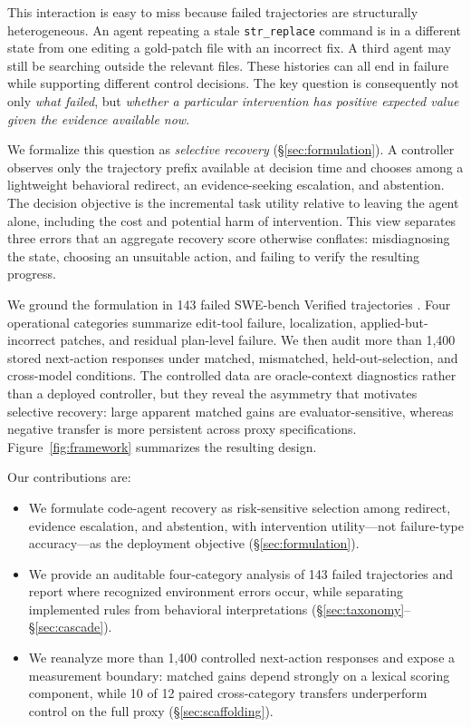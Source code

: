 \documentclass{article}
\begin{document}
This interaction is easy to miss because failed trajectories are structurally
heterogeneous.  An agent repeating a stale \texttt{str\_replace} command is in a
different state from one editing a gold-patch file with an incorrect fix.  A
third agent may still be searching outside the relevant files.  These histories
can all end in failure while supporting different control decisions.  The key
question is consequently not only \emph{what failed}, but \emph{whether a
particular intervention has positive expected value given the evidence
available now}.

We formalize this question as \emph{selective recovery}
(\S\ref{sec:formulation}).  A controller observes only the trajectory prefix
available at decision time and chooses among a lightweight behavioral redirect,
an evidence-seeking escalation, and abstention.  The decision objective is the
incremental task utility relative to leaving the agent alone, including the
cost and potential harm of intervention.  This view separates three errors that
an aggregate recovery score otherwise conflates: misdiagnosing the state,
choosing an unsuitable action, and failing to verify the resulting progress.

We ground the formulation in 143 failed SWE-bench Verified trajectories
\citep{jimenez2024swebench}.  Four operational categories summarize edit-tool
failure, localization, applied-but-incorrect patches, and residual plan-level
failure.  We then audit more than 1,400 stored next-action responses under
matched, mismatched, held-out-selection, and cross-model conditions.  The
controlled data are oracle-context diagnostics rather than a deployed
controller, but they reveal the asymmetry that motivates selective recovery:
large apparent matched gains are evaluator-sensitive, whereas negative transfer
is more persistent across proxy specifications.  Figure~\ref{fig:framework}
summarizes the resulting design.

Our contributions are:
\begin{itemize}
\setlength{\itemsep}{0pt}
\item We formulate code-agent recovery as risk-sensitive selection among
redirect, evidence escalation, and abstention, with intervention utility---not
failure-type accuracy---as the deployment objective (\S\ref{sec:formulation}).
\item We provide an auditable four-category analysis of 143 failed trajectories
and report where recognized environment errors occur, while separating
implemented rules from behavioral interpretations
(\S\ref{sec:taxonomy}--\S\ref{sec:cascade}).
\item We reanalyze more than 1,400 controlled next-action responses and expose
a measurement boundary: matched gains depend strongly on a lexical scoring
component, while 10 of 12 paired cross-category transfers underperform control
on the full proxy (\S\ref{sec:scaffolding}).
\end{itemize}
\end{document}
